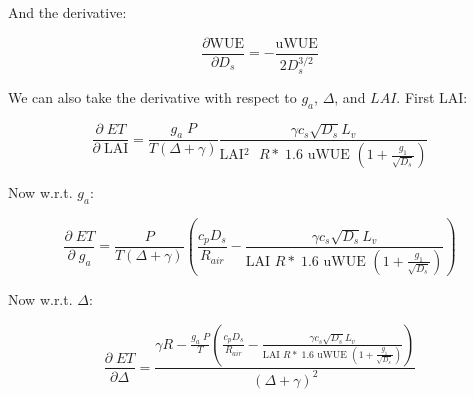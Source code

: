 And the derivative:

\begin{equation}
  \frac{\partial \text{WUE}}{\partial D_s} = -\frac{\text{uWUE}}{2 D_s^{3/2}}
\end{equation}

We can also take the derivative with respect to $g_a$, $\Delta$, and $LAI$. First LAI:

\begin{equation}
  \frac{\partial \; ET}{\partial \; \text{LAI}} = \frac{ g_a\; P }{T \left( \Delta + \gamma \right)}  \frac{\gamma c_s \sqrt{D_s} L_v }{\text{LAI$^2$ } R* \; 1.6 \text{ uWUE } (1 + \frac{g_1}{\sqrt{D_s}})}
\end{equation}

Now w.r.t. $g_a$:


\begin{equation}
  \frac{\partial \; ET}{\partial \; g_a} = \frac{ P }{T \left( \Delta + \gamma \right)} \left(\frac{c_p D_s}{R_{air}} -  \frac{\gamma c_s \sqrt{D_s} L_v }{\text{LAI } R* \; 1.6 \text{ uWUE } (1 + \frac{g_1}{\sqrt{D_s}})}\right)
\end{equation}

Now w.r.t. $\Delta$:


\begin{equation}
\frac{\partial \;  ET}{\partial \Delta} = \frac{\gamma R - \frac{g_a\; P}{T} \left( \frac{ c_p D_{s}}{R_{air}} - \frac{\gamma c_s \sqrt{D_s} L_v }{\text{LAI } R* \; 1.6 \text{ uWUE } (1 + \frac{g_1}{\sqrt{D_s}})} \right) }{ (\Delta + \gamma)^2}
\end{equation}


